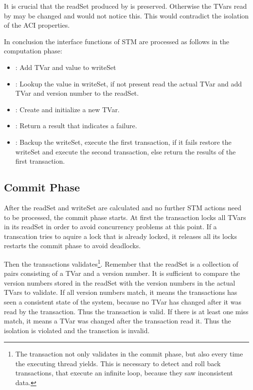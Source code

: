 It is crucial that the readSet produced by  is preserved. Otherwise the TVars read by  may be changed and 
 would not notice this. This would contradict the isolation of the ACI properties. 

In conclusion the interface functions of STM are processed as follows in the computation phase:
\begin{itemize}
 \item {}: Add TVar and value to writeSet
 \item {}: Lookup the value in writeSet, if not present read the actual TVar and add TVar and version number to the readSet.
 \item {}: Create and initialize a new TVar. 
 \item {}: Return a result that indicates a failure.
 \item {}: Backup the writeSet, execute the first transaction, if it fails restore the writeSet and execute the second transaction, else return the results of the first transaction.
\end{itemize}

\subsection{Commit Phase}
After the readSet and writeSet are calculated and no further STM actions need to be processed, the commit phase starts.
At first the transaction locks all TVars in its readSet in order to avoid concurrency problems at this point.
If a transcation tries to aquire a lock that is already locked, it releases all its locks restarts the commit phase to
avoid deadlocks.

Then the transactions validates\footnote{The transaction not only validates in the commit phase, but also every time the executing
thread yields. This is necessary to detect and roll back transactions, that execute an infinite loop, because they saw inconsistent
data.}. Remember that the readSet is a collection of pairs consisting of a TVar and a version number.
It is sufficient to compare the version numbers stored in the readSet with the version numbers in the actual TVars to validate. 
If all version numbers match, it means the transactions has seen a consistent state
of the system, because no TVar has changed after it was read by the transaction. Thus the transaction is valid.
If there is at least one miss match, it means a TVar was changed after the transaction read it. Thus the isolation
is violated and the transction is invalid.

